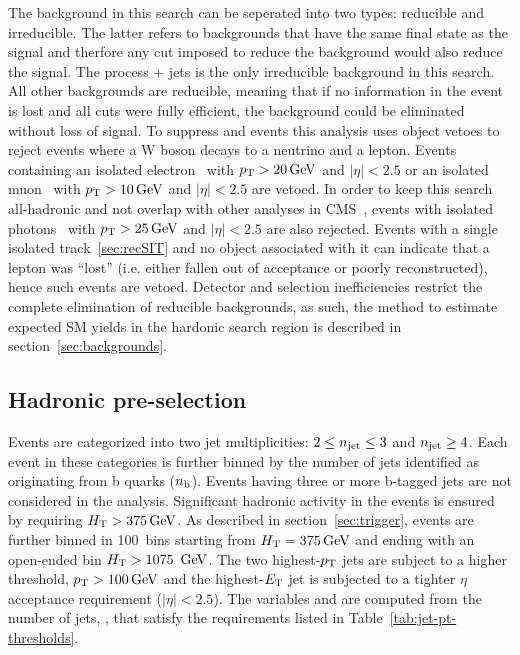 The background in this search can be seperated into two types: 
reducible and irreducible. The latter refers to backgrounds that 
have the same final state as the signal and therfore any cut imposed 
to reduce the background would also reduce the signal. The process 
\znunu + jets is the only irreducible background in this search. 
All other backgrounds are reducible, meaning that if no information 
in the event is lost and all cuts were fully efficient, the background 
could be eliminated without loss of signal. To suppress \wj and \ttbar
events this analysis uses object vetoes to reject events where a W boson 
decays to a neutrino and a lepton. Events containing 
an isolated electron~\cite{PAS-EGM-10-004} with $p_{\mathrm{T}} > 20\,\text{Ge\hspace{-.08em}V}$ 
and $|\eta| < 2.5$ or an isolated muon~\cite{PAS-MUO-10-002}
with $p_{\mathrm{T}} > 10\,\text{Ge\hspace{-.08em}V}$ and $|\eta| < 2.5$ are vetoed. In order to keep this 
search all-hadronic and not overlap with other analyses in 
CMS~\cite{CMS-PAS-SUS-14-008,photon7TeV}, events with isolated 
photons~\cite{PAS-EGM-10-006} with $p_{\mathrm{T}} > 25\,\text{Ge\hspace{-.08em}V}$ 
and $|\eta| < 2.5$ are also rejected. Events with a single isolated 
track~\ref{sec:recSIT} and no object associated with it can indicate that
a lepton was ``lost'' (i.e. either fallen out of acceptance or poorly 
reconstructed), hence such events are vetoed. Detector and selection 
inefficiencies restrict the complete elimination of reducible backgrounds, 
as such, the method to estimate expected SM yields in the hardonic search
region is described in section~\ref{sec:backgrounds}.

\subsection{Hadronic pre-selection}

Events are categorized into two jet multiplicities: $2 \leq n_{\text{jet}} \leq 3$ and 
$n_{\text{jet}} \geq 4$.  Each event in these categories is further binned by the number
of jets identified as originating from b quarks ($n_{\text{b}}$). Events having 
three or more b-tagged jets are not considered in the analysis.      
Significant hadronic activity in the events is ensured by requiring
$\mbox{$H_\text{T}$} > 375\,\text{Ge\hspace{-.08em}V}$. As described in section~\ref{sec:trigger}, events are further
binned in 100~\gev bins starting from $\mbox{$H_\text{T}$} = 375\,\text{Ge\hspace{-.08em}V}$ and ending with 
an open-ended bin $\mbox{$H_\text{T}$} > 1075~\,\text{Ge\hspace{-.08em}V}$. The two highest-$p_{\mathrm{T}}$ jets are 
subject to a higher threshold, $p_{\mathrm{T}}>100\,\text{Ge\hspace{-.08em}V}$ and the highest-${E_{\text T}}$ jet 
is subjected to a tighter $\eta$ acceptance requirement ($|\eta| < 2.5$). 
The variables \scalht and \mht are computed from the number of jets, 
\njet, that satisfy the \pt requirements listed in Table~\ref{tab:jet-pt-thresholds}. 

